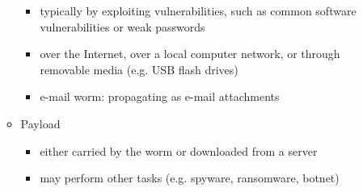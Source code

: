 \documentclass[final]{article}
\begin{document}
\begin{itemize}[nosep]
\begin{itemize}[nosep]
                    \begin{itemize}[nosep]
                        \item typically by exploiting vulnerabilities, such as common software vulnerabilities or weak passwords
                        \item over the Internet, over a local computer network, or through removable media (e.g. USB flash drives)
                        \item e-mail worm: propagating as e-mail attachments
                    \end{itemize}
              \item Payload
                    \begin{itemize}[nosep]
                        \item either carried by the worm or downloaded from a server
                        \item may perform other tasks (e.g. spyware, ransomware, botnet)
                    \end{itemize}
          \end{itemize}
\end{itemize}
\end{document}
